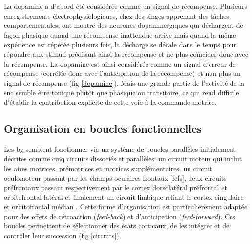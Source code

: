 La dopamine a d'abord été considérée comme un signal de récompense. Plusieurs enregistrements électrophysiologiques, chez des singes apprenant des tâches comportementales, ont montré des neurones dopaminergiques qui déchargent de façon phasique quand une récompense inattendue arrive mais quand la même expérience est répétée plusieurs fois, la décharge se décale dans le temps pour répondre aux stimuli prédisant ainsi la récompense et ne plus coïncider donc avec la récompense. La dopamine est ainsi considérée comme un signal d'erreur de récompense (corrélée donc avec l'anticipation de la récompense) et non plus un signal de récompense \cite{Houk:1995, Schultz:1997, Hollerman:1998, Morris:2004, Takikawa:2004, Bayer:2005,Schultz:2006} (fig \ref{dopamine}). Mais une grande partie de l'activité de la \gls{snc} semble être tonique plutôt que phasique ou transitoire, ce qui rend difficile d'établir la contribution explicite de cette voie à la commande motrice.\\


\subsection{Organisation en boucles fonctionnelles}


Les \gls{bg} semblent fonctionner via un système de boucles parallèles initialement décrites comme cinq circuits dissociés et parallèles: un circuit moteur qui inclut les aires motrices, prémotrices et motrices supplémentaires, un circuit oculomoteur passant par les champs oculaires frontaux [\glspl{fef}], deux circuits préfrontaux passant respectivement par le cortex dorsolatéral préfrontal et orbitofrontal latéral et finalement un circuit limbique reliant le cortex cingulaire et orbitofrontal médian \cite{Alexander:1990, Alexander:1986, Albin:1989,Mink:1996}. Cette forme d'organisation est particulièrement adaptée pour des effets de rétroaction (\textit{feed-back}) et d'anticipation (\textit{feed-forward}). Ces boucles permettent de sélectionner des états corticaux, de les intégrer et de contrôler leur succession \cite{Berns:1998, Beiser:1998, Hikosaka:1999, Nakahara:2001} (fig \ref{circuits}).\\



